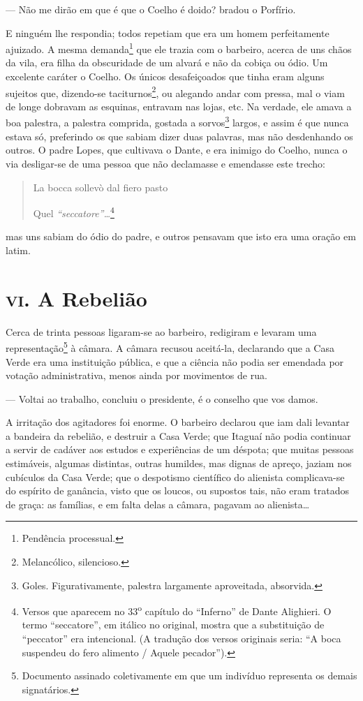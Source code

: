 --- Não me dirão em que é que o Coelho é doido? bradou o Porfírio.

E ninguém lhe respondia; todos repetiam que era um homem perfeitamente
ajuizado. A mesma demanda\footnote{Pendência processual.} que ele trazia
com o barbeiro, acerca de uns chãos da vila, era filha da obscuridade de
um alvará e não da cobiça ou ódio. Um excelente caráter o Coelho. Os
únicos desafeiçoados que tinha eram alguns sujeitos que, dizendo-se
taciturnos\footnote{Melancólico, silencioso.}, ou alegando andar com
pressa, mal o viam de longe dobravam as esquinas, entravam nas lojas,
etc. Na verdade, ele amava a boa palestra, a palestra comprida, gostada
a sorvos\footnote{Goles. Figurativamente, palestra largamente
  aproveitada, absorvida.} largos, e assim é que nunca estava só,
preferindo os que sabiam dizer duas palavras, mas não desdenhando os
outros. O padre Lopes, que cultivava o Dante, e era inimigo do Coelho,
nunca o via desligar-se de uma pessoa que não declamasse e emendasse
este trecho:

\begin{quote}
La bocca sollevò dal fiero pasto

Quel \emph{``seccatore''\ldots{}}\footnote{Versos que aparecem no
  33\textsuperscript{o} capítulo do ``Inferno'' de Dante Alighieri. O
  termo ``seccatore'', em itálico no original, mostra que a substituição
  de ``peccator'' era intencional. (A tradução dos versos originais
  seria: ``A boca suspendeu do fero alimento / Aquele pecador'').}
\end{quote}

mas uns sabiam do ódio do padre, e outros pensavam que isto era uma
oração em latim.

\chapter{\textsc{vi}. A Rebelião}

Cerca de trinta pessoas ligaram-se ao barbeiro, redigiram e levaram uma
representação\footnote{Documento assinado coletivamente em que um
  indivíduo representa os demais signatários.} à câmara. A câmara
recusou aceitá-la, declarando que a Casa Verde era uma instituição
pública, e que a ciência não podia ser emendada por votação
administrativa, menos ainda por movimentos de rua.

--- Voltai ao trabalho, concluiu o presidente, é o conselho que vos
damos.

A irritação dos agitadores foi enorme. O barbeiro declarou que iam dali
levantar a bandeira da rebelião, e destruir a Casa Verde; que Itaguaí
não podia continuar a servir de cadáver aos estudos e experiências de um
déspota; que muitas pessoas estimáveis, algumas distintas, outras
humildes, mas dignas de apreço, jaziam nos cubículos da Casa Verde; que
o despotismo científico do alienista complicava-se do espírito de
ganância, visto que os loucos, ou supostos tais, não eram tratados de
graça: as famílias, e em falta delas a câmara, pagavam ao
alienista\ldots{}

